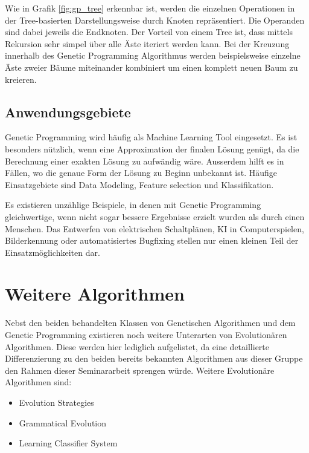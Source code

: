 Wie in Grafik \ref{fig:gp_tree} erkennbar ist, werden die einzelnen Operationen in der Tree-basierten
Darstellungsweise durch Knoten repräsentiert. Die Operanden sind dabei jeweils die Endknoten.
Der Vorteil von einem Tree ist, dass mittels Rekursion sehr simpel über alle Äste iteriert werden
kann. Bei der Kreuzung innerhalb des Genetic Programming Algorithmus werden beispielsweise einzelne
Äste zweier Bäume miteinander kombiniert um einen komplett neuen Baum zu kreieren. \cite{GenTree}

\subsection{Anwendungsgebiete}
Genetic Programming wird häufig als Machine Learning Tool eingesetzt. Es ist besonders nützlich, wenn
eine Approximation der finalen Lösung genügt, da die Berechnung einer exakten Lösung zu aufwändig
wäre. Ausserdem hilft es in Fällen, wo die genaue Form der Lösung zu Beginn unbekannt ist. Häufige
Einsatzgebiete sind Data Modeling, Feature selection und Klassifikation.

Es existieren unzählige Beispiele, in denen mit Genetic Programming gleichwertige, wenn nicht sogar
bessere Ergebnisse erzielt wurden als durch einen Menschen. Das Entwerfen von elektrischen
Schaltplänen, KI in Computerspielen, Bilderkennung oder automatisiertes Bugfixing stellen nur einen
kleinen Teil der Einsatzmöglichkeiten dar. \cite{Koz10}


\section{Weitere Algorithmen}
Nebst den beiden behandelten Klassen von Genetischen Algorithmen und dem Genetic Programming existieren
noch weitere Unterarten von Evolutionären Algorithmen. Diese werden hier lediglich aufgelistet, da
eine detaillierte Differenzierung zu den beiden bereits bekannten Algorithmen aus dieser Gruppe den Rahmen
dieser Seminararbeit sprengen würde. Weitere Evolutionäre Algorithmen sind:

\begin{itemize}
  \item Evolution Strategies
  \item Grammatical Evolution
  \item Learning Classifier System
\end{itemize}